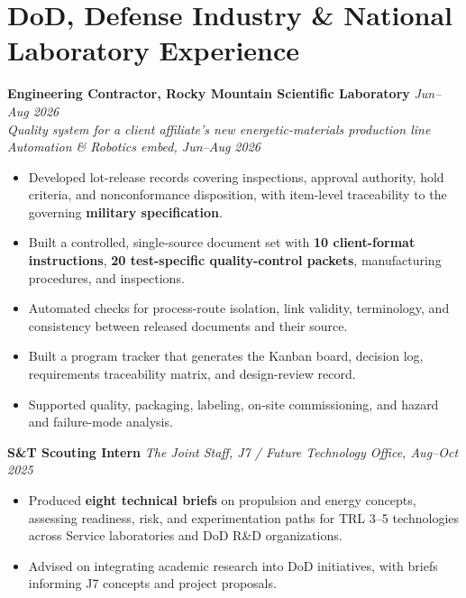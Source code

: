 \documentclass[letterpaper,10pt]{article}
\newcommand{\keep}{\needspace{4\baselineskip}}
\newcommand{\keepsection}{\needspace{6\baselineskip}}
\begin{document}
\keepsection\section*{DoD, Defense Industry \& National Laboratory Experience}
\textbf{Engineering Contractor, Rocky Mountain Scientific Laboratory} \hfill \textit{Jun--Aug 2026}\\
\textit{Quality system for a client affiliate's new energetic-materials production line}\\
\textit{Automation \& Robotics embed, Jun--Aug 2026}
\begin{itemize}
    \item Developed lot-release records covering inspections, approval authority, hold criteria, and nonconformance disposition, with item-level traceability to the governing \textbf{military specification}.
    \item Built a controlled, single-source document set with \textbf{10 client-format instructions}, \textbf{20 test-specific quality-control packets}, manufacturing procedures, and inspections.
    \item Automated checks for process-route isolation, link validity, terminology, and consistency between released documents and their source.
    \item Built a program tracker that generates the Kanban board, decision log, requirements traceability matrix, and design-review record.
    \item Supported quality, packaging, labeling, on-site commissioning, and hazard and failure-mode analysis.
\end{itemize}

\keep\textbf{S\&T Scouting Intern} \hfill \textit{The Joint Staff, J7 / Future Technology Office, Aug--Oct 2025}
\begin{itemize}
    \item Produced \textbf{eight technical briefs} on propulsion and energy concepts, assessing readiness, risk, and experimentation paths for TRL 3--5 technologies across Service laboratories and DoD R\&D organizations.
    \item Advised on integrating academic research into DoD initiatives, with briefs informing J7 concepts and project proposals.
\end{itemize}
\end{document}

